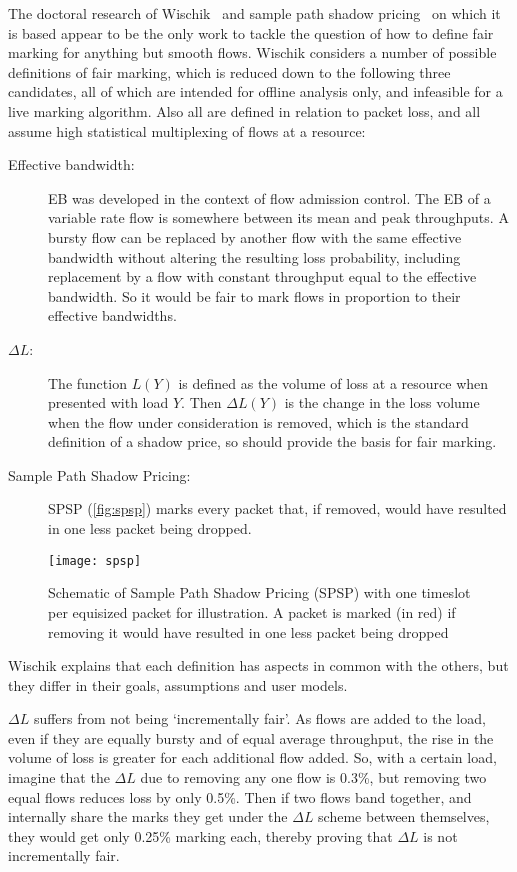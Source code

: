 The doctoral research of Wischik~\cite{Wischik99:Mark_Fairly, Wischik99:Large_Dev_PhD} and sample path shadow pricing~\cite{Kelly98:Shadow_prices_prop_fair} on which it is based appear to be the only work to tackle the question of how to define fair marking for anything but smooth flows. Wischik considers a number of possible definitions of fair marking, which is reduced down to the following three candidates, all of which are intended for offline analysis only, and infeasible for a live marking algorithm. Also all are defined in relation to packet loss, and all assume high statistical multiplexing of flows at a resource:
\begin{description}
	\item[Effective bandwidth:] EB was developed in the context of flow admission control. The EB of a variable rate flow is somewhere between its mean and peak throughputs. A bursty flow can be replaced by another flow with the same effective bandwidth without altering the resulting loss probability, including replacement by a flow with constant throughput equal to the effective bandwidth. So it would be fair to mark flows in proportion to their effective bandwidths.
	\item[\boldmath\(\Delta{L}\):] The function \(L(Y)\) is defined as the volume of loss at a resource when presented with load \(Y\). Then \(\Delta{L(Y)}\) is the change in the loss volume when the flow under consideration is removed, which is the standard definition of a shadow price, so should provide the basis for fair marking. 
	\item[Sample Path Shadow Pricing:] SPSP (\autoref{fig:spsp}) marks every packet that, if removed, would have resulted in one less packet being dropped.
\end{description}

\begin{figure}[h]
	\centering
	\texttt{[image: spsp]}
	\caption{Schematic of Sample Path Shadow Pricing (SPSP) with one timeslot per equisized packet for illustration. A packet is marked (in red) if removing it would have resulted in one less packet being dropped}\label{fig:spsp}
\end{figure}

Wischik explains that each definition has aspects in common with the others, but they differ in their goals, assumptions and user models. 

\(\Delta{L}\) suffers from not being `incrementally fair'. As flows are added to the load, even if they are equally bursty and of equal average throughput, the rise in the volume of loss is greater for each additional flow added. So, with a certain load, imagine that the \(\Delta{L}\) due to removing any one flow is 0.3\%, but removing two equal flows reduces loss by only 0.5\%. Then if two flows band together, and internally share the marks they get under the \(\Delta{L}\) scheme between themselves, they would get only 0.25\% marking each, thereby proving that \(\Delta{L}\) is not incrementally fair.

